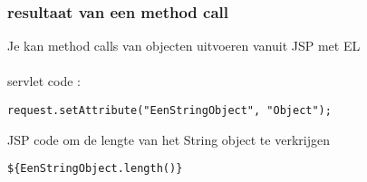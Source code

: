 \documentclass{beamer}
\begin{document}
\begin{frame}[fragile]

\frametitle{resultaat van een method call}
{\large 
Je kan method calls van objecten uitvoeren vanuit JSP met EL\\~\\

servlet code :

\begin{verbatim}request.setAttribute("EenStringObject", "Object");\end{verbatim}

JSP code om de lengte van het String object te verkrijgen

\begin{verbatim}${EenStringObject.length()}\end{verbatim}
}
\end{frame}
\end{document}
